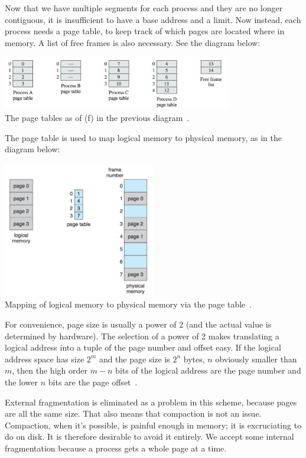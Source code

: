 Now that we have multiple segments for each process and they are no longer contiguous, it is insufficient to have a base address and a limit. Now instead, each process needs a page table, to keep track of which pages are located where in memory. A list of free frames is also necessary. See the diagram below:

\begin{center}
\includegraphics[width=0.75\textwidth]{images/page-tables.png}\\
The page tables as of (f) in the previous diagram~\cite{osi}.
\end{center}

The page table is used to map logical memory to physical memory, as in the diagram below:

\begin{center}
\includegraphics[width=0.5\textwidth]{images/page-table-mapping.png}\\
Mapping of logical memory to physical memory via the page table~\cite{osc}.
\end{center}

For convenience, page size is usually a power of 2 (and the actual value is determined by hardware). The selection of a power of 2 makes translating a logical address into a tuple of the page number and offset easy. If the logical address space has size $2^{m}$ and the page size is $2^{n}$ bytes, $n$ obviously smaller than $m$, then the high order $m - n$ bits of the logical address are the page number and the lower $n$ bits are the page offset~\cite{osc}. 

External fragmentation is eliminated as a problem in this scheme, because pages are all the same size. That also means that compaction is not an issue. Compaction, when it's possible, is painful enough in memory; it is excruciating to do on disk. It is therefore desirable to avoid it entirely. We accept some internal fragmentation because a process gets a whole page at a time. 

